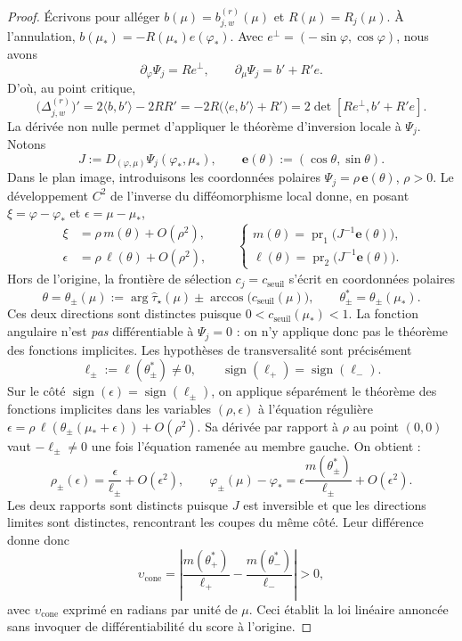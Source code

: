 \documentclass[11pt,a4paper]{article}
\theoremstyle{definition}
\theoremstyle{remark}
\begin{document}
\begin{proof}
Écrivons pour alléger $b(\mu)=b_{j,w}^{(r)}(\mu)$ et $R(\mu)=R_j(\mu)$. À l'annulation, $b(\mu_*)=-R(\mu_*)e(\varphi_*)$. Avec $e^\perp=(-\sin\varphi,\cos\varphi)$, nous avons
\[
 \partial_\varphi\Psi_j=R e^\perp,
 \qquad \partial_\mu\Psi_j=b'+R'e.
\]
D'où, au point critique,
\[
 \bigl(\Delta_{j,w}^{(r)}\bigr)'
 =2\langle b,b'\rangle-2RR'
 =-2R\bigl(\langle e,b'\rangle+R'\bigr)
 =2\det[Re^\perp,b'+R'e].
\]
La dérivée non nulle permet d'appliquer le théorème d'inversion locale à $\Psi_j$. Notons
\[
 J:=D_{(\varphi,\mu)}\Psi_j(\varphi_*,\mu_*),
 \qquad \mathbf e(\theta):=(\cos\theta,\sin\theta).
\]
Dans le plan image, introduisons les coordonnées polaires $\Psi_j=\rho\,\mathbf e(\theta)$, $\rho>0$. Le développement $C^2$ de l'inverse du difféomorphisme local donne, en posant $\xi=\varphi-\varphi_*$ et $\epsilon=\mu-\mu_*$,
\[
 \begin{split}
 \xi&=\rho\,m(\theta)+O(\rho^2),\\
 \epsilon&=\rho\,\ell(\theta)+O(\rho^2),
 \end{split}
 \qquad
 \begin{cases}
 m(\theta)=\operatorname{pr}_1\!\bigl(J^{-1}\mathbf e(\theta)\bigr),\\
 \ell(\theta)=\operatorname{pr}_2\!\bigl(J^{-1}\mathbf e(\theta)\bigr).
 \end{cases}
\]
Hors de l'origine, la frontière de sélection $c_j=c_{\mathrm{seuil}}$ s'écrit en coordonnées polaires
\[
 \theta=\theta_\pm(\mu)
 :=\arg\widehat\tau_\star(\mu)
 \pm\arccos\bigl(c_{\mathrm{seuil}}(\mu)\bigr),
 \qquad \theta_\pm^*=\theta_\pm(\mu_*).
\]
Ces deux directions sont distinctes puisque $0<c_{\mathrm{seuil}}(\mu_*)<1$. La fonction angulaire n'est \emph{pas} différentiable à $\Psi_j=0$ : on n'y applique donc pas le théorème des fonctions implicites. Les hypothèses de transversalité sont précisément
\[
 \ell_\pm:=\ell(\theta_\pm^*)\ne0,
 \qquad \operatorname{sign}(\ell_+)=\operatorname{sign}(\ell_-).
\]
Sur le côté $\operatorname{sign}(\epsilon)=\operatorname{sign}(\ell_\pm)$, on applique séparément le théorème des fonctions implicites dans les variables $(\rho,\epsilon)$ à l'équation régulière
$\epsilon=\rho\,\ell(\theta_\pm(\mu_*+\epsilon))+O(\rho^2)$. Sa dérivée par rapport à $\rho$ au point $(0,0)$ vaut $-\ell_\pm\ne0$ une fois l'équation ramenée au membre gauche. On obtient :
\[
 \rho_\pm(\epsilon)=\frac{\epsilon}{\ell_\pm}+O(\epsilon^2),
 \qquad
 \varphi_\pm(\mu)-\varphi_*
 =\epsilon\frac{m(\theta_\pm^*)}{\ell_\pm}+O(\epsilon^2).
\]
Les deux rapports sont distincts puisque $J$ est inversible et que les directions limites sont distinctes, rencontrant les coupes du même côté. Leur différence donne donc
\[
 \boxed{\upsilon_{\mathrm{cone}}
 =\left|\frac{m(\theta_+^*)}{\ell_+}
 -\frac{m(\theta_-^*)}{\ell_-}\right|>0,}
\]
avec $\upsilon_{\mathrm{cone}}$ exprimé en radians par unité de $\mu$. Ceci établit la loi linéaire annoncée sans invoquer de différentiabilité du score à l'origine.
\end{proof}
\end{document}
